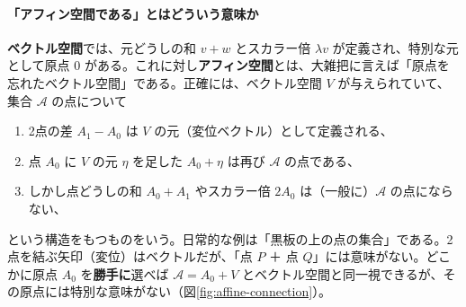 \documentclass[uplatex, dvipdfmx, book]{jsbook}
\begin{document}
\paragraph{「アフィン空間である」とはどういう意味か}
\textbf{ベクトル空間}では、元どうしの和 $v + w$ とスカラー倍 $\lambda v$ が定義され、特別な元として原点 $0$ がある。これに対し\textbf{アフィン空間}とは、大雑把に言えば「原点を忘れたベクトル空間」である。正確には、ベクトル空間 $V$ が与えられていて、集合 $\mathcal{A}$ の点について
\begin{enumerate}
    \item 2点の差 $A_1 - A_0$ は $V$ の元（変位ベクトル）として定義される、
    \item 点 $A_0$ に $V$ の元 $\eta$ を足した $A_0 + \eta$ は再び $\mathcal{A}$ の点である、
    \item しかし点どうしの和 $A_0 + A_1$ やスカラー倍 $2A_0$ は（一般に）$\mathcal{A}$ の点にならない、
\end{enumerate}
という構造をもつものをいう。日常的な例は「黒板の上の点の集合」である。2点を結ぶ矢印（変位）はベクトルだが、「点 $P$ ＋ 点 $Q$」には意味がない。どこかに原点 $A_0$ を\textbf{勝手に}選べば $\mathcal{A} = A_0 + V$ とベクトル空間と同一視できるが、その原点には特別な意味がない（図\ref{fig:affine-connection}）。
\end{document}
